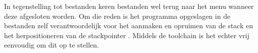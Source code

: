 In tegenstelling tot \cas bestanden keren \prg bestanden wel terug naar het menu wanneer deze afgesloten worden. Om die reden is het programma opgeslagen in de \prg bestanden zelf verantwoordelijk voor het aanmaken en opruimen van de stack en het herpositioneren van de stackpointer . Middels de  toolchain is het echter vrij eenvoudig om dit op te stellen.